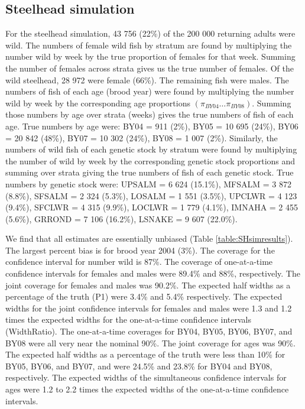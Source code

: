 \documentclass[%
                leqno,         %
%
]{nrc1}                          %
\begin{document}
\subsection*{Steelhead simulation}

For the steelhead simulation, 43 756 (22\%) of the 200 000 returning adults were wild. The numbers of female wild fish by stratum are found by multiplying the number wild by week by the true proportion of females for that week. Summing the number of females across strata gives us the true number of females. Of the wild steelhead, 28 972 were female (66\%). The remaining fish were males. The numbers of fish of each age (brood year) were found by multiplying the number wild by week by the corresponding age proportions $(\pi_{BY04}\ldots \pi_{BY08})$. Summing those numbers by age over strata (weeks) gives the true numbers of fish of each age. True numbers by age were: BY04 = 911 (2\%), BY05 = 10 695 (24\%), BY06 = 20 842 (48\%), BY07 = 10 302 (24\%), BY08 = 1 007 (2\%). Similarly, the numbers of wild fish of each genetic stock by stratum were found by multiplying the number of wild by week by the corresponding genetic stock proportions and summing over strata giving the true numbers of fish of each genetic stock. True numbers by genetic stock were: UPSALM = 6 624 (15.1\%), MFSALM = 3 872 (8.8\%), SFSALM = 2 324 (5.3\%), LOSALM = 1 551 (3.5\%), UPCLWR = 4 123 (9.4\%), SFCLWR = 4 315 (9.9\%), LOCLWR = 1 779 (4.1\%), IMNAHA = 2 455 (5.6\%), GRROND = 7 106 (16.2\%), LSNAKE = 9 607 (22.0\%).

We find that all estimates are essentially unbiased (Table \ref{table:SHsimresults}). The largest percent bias is for brood year 2004 (3\%). The coverage for the confidence interval for number wild is 87\%.  The coverage of one-at-a-time confidence intervals for females and males were 89.4\% and 88\%, respectively. The joint coverage for females and males was 90.2\%. The expected half widths as a percentage of the truth (P1) were 3.4\% and 5.4\% respectively.  The expected widths for the joint confidence intervals for females and males were 1.3 and 1.2 times the expected widths for the one-at-a-time confidence intervals (WidthRatio). The one-at-a-time coverages for BY04, BY05, BY06, BY07, and BY08 were all very near the nominal 90\%. The joint coverage for ages was 90\%.  The expected half widths as a percentage of the truth were less than 10\% for BY05, BY06, and BY07, and were 24.5\% and 23.8\% for BY04 and BY08, respectively. The expected widths of the simultaneous confidence intervals for ages were 1.2 to 2.2 times the expected widths of the one-at-a-time confidence intervals.
\end{document}
